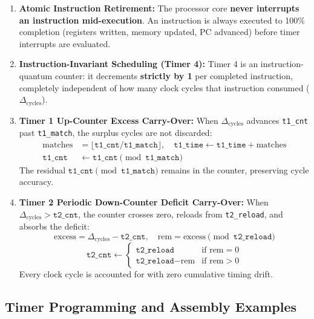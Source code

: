\documentclass[11pt,a4paper]{article}
\begin{document}
\begin{archcallout}[title={Non-Preemptible Instruction Execution and Zero-Loss Carry-Over}]
\begin{enumerate}
    \item \textbf{Atomic Instruction Retirement:} The processor core \textbf{never interrupts an instruction mid-execution}. An instruction is always executed to 100\% completion (registers written, memory updated, PC advanced) before timer interrupts are evaluated.
    \item \textbf{Instruction-Invariant Scheduling (Timer 4):} Timer 4 is an instruction-quantum counter: it decrements \textbf{strictly by 1} per completed instruction, completely independent of how many clock cycles that instruction consumed ($\Delta_{\text{cycles}}$).
    \item \textbf{Timer 1 Up-Counter Excess Carry-Over:} When $\Delta_{\text{cycles}}$ advances \texttt{t1\_cnt} past \texttt{t1\_match}, the surplus cycles are not discarded:
    \[
    \begin{aligned}
    \text{matches} &= \lfloor \texttt{t1\_cnt} / \texttt{t1\_match} \rfloor, \quad \texttt{t1\_time} \leftarrow \texttt{t1\_time} + \text{matches} \\
    \texttt{t1\_cnt} &\leftarrow \texttt{t1\_cnt} \pmod{\texttt{t1\_match}}
    \end{aligned}
    \]
    The residual $\texttt{t1\_cnt} \pmod{\texttt{t1\_match}}$ remains in the counter, preserving cycle accuracy.
    \item \textbf{Timer 2 Periodic Down-Counter Deficit Carry-Over:} When $\Delta_{\text{cycles}} > \texttt{t2\_cnt}$, the counter crosses zero, reloads from \texttt{t2\_reload}, and absorbs the deficit:
    \[
    \text{excess} = \Delta_{\text{cycles}} - \texttt{t2\_cnt}, \quad \text{rem} = \text{excess} \pmod{\texttt{t2\_reload}}
    \]
    \[
    \texttt{t2\_cnt} \leftarrow \begin{cases} \texttt{t2\_reload} & \text{if } \text{rem} = 0 \\ \texttt{t2\_reload} - \text{rem} & \text{if } \text{rem} > 0 \end{cases}
    \]
    Every clock cycle is accounted for with zero cumulative timing drift.
\end{enumerate}
\end{archcallout}

\subsection{Timer Programming and Assembly Examples}
\end{document}
